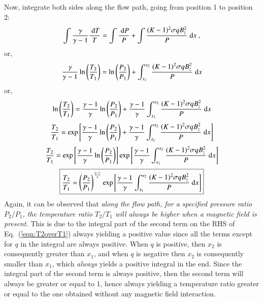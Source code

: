 \documentclass[oneside,10pt,onecolumn]{waflreport}
\newcommand\frameeqn[1]{\fbox{$\displaystyle #1$}}
\newcommand{\ordi}{\; {\rm d}}
\begin{document}
%
Now, integrate both sides along the flow path, going from position 1 to position 2:
%
\begin{equation}
\int \frac{\gamma}{\gamma-1}\frac{\ordi T}{T}
= \int \frac{\ordi P}{P}
+ \int \frac{(K-1)^2 \sigma q B_z^2}{P} \ordi x~,
\end{equation}
%
or,
%
\begin{equation}
\frac{\gamma}{\gamma-1} \ln \left( \frac{T_2}{T_1} \right)
= \ln \left( \frac{P_2}{P_1} \right) + \int_{x_1}^{x_2} \frac{(K-1)^2 \sigma q B_z^2}{P} \ordi x
\end{equation}
%
or,
%
\begin{equation}
\ln \left( \frac{T_2}{T_1} \right)
=   \frac{\gamma-1}{\gamma} \ln \left( \frac{P_2}{P_1} \right)
  + \frac{\gamma-1}{\gamma}\int_{x_1}^{x_2} \frac{(K-1)^2 \sigma q B_z^2}{P} \ordi x
\end{equation}
%
%
\begin{equation}
\frac{T_2}{T_1}
= \exp \left[  \frac{\gamma-1}{\gamma} \ln \left( \frac{P_2}{P_1} \right)
  + \frac{\gamma-1}{\gamma}\int_{x_1}^{x_2} \frac{(K-1)^2 \sigma q B_z^2}{P} \ordi x \right]
\end{equation}
%
%
\begin{equation}
\frac{T_2}{T_1}
= \exp \left[  \frac{\gamma-1}{\gamma} \ln \left( \frac{P_2}{P_1} \right) \right]
  \exp \left[ \frac{\gamma-1}{\gamma}\int_{x_1}^{x_2} \frac{(K-1)^2 \sigma q B_z^2}{P} \ordi x \right]
\end{equation}
%
%
\begin{equation}
\frameeqn{
\frac{T_2}{T_1}
= \left( \frac{P_2}{P_1} \right)^\frac{\gamma-1}{\gamma}
  \exp \left[ \frac{\gamma-1}{\gamma}\int_{x_1}^{x_2} \frac{(K-1)^2 \sigma q B_z^2}{P} \ordi x \right]
}
\label{eqn:T2overT1}
\end{equation}
%
Again, it can be observed that \emph{along the flow path, for a specified pressure ratio $P_2/P_1$,
the temperature ratio $T_2/T_1$ will always be higher when a magnetic field
is present.} This is due to the integral part of the second term on the RHS of
Eq.\ (\ref{eqn:T2overT1}) always yielding a positive value since all the terms except for $q$
in the integral are always positive. When $q$ is positive, then $x_2$ is consequently greater
than $x_1$, and when $q$ is negative then $x_2$ is consequently smaller than $x_1$, which \emph{always}
yields a positive integral in the end. Since the integral part of the second term is always
positive, then the second term will always be greater or equal to 1, hence always yielding a
temperature ratio greater or equal to the one obtained without any magnetic field
interaction.
\end{document}
